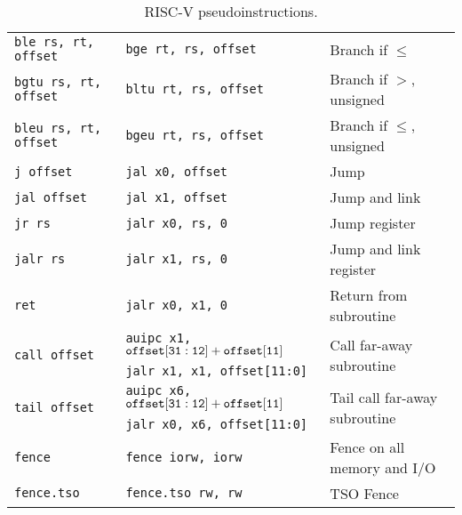 \begin{table}[h]
\begin{small}
\begin{center}
\begin{tabular}{l l l}
{\tt ble rs, rt, offset} & {\tt bge rt, rs, offset} & Branch if $\leq$ \\
{\tt bgtu rs, rt, offset} & {\tt bltu rt, rs, offset} & Branch if $>$, unsigned \\
{\tt bleu rs, rt, offset} & {\tt bgeu rt, rs, offset} & Branch if $\leq$, unsigned \\
\hline
{\tt j offset} & {\tt jal x0, offset} & Jump \\
{\tt jal offset} & {\tt jal x1, offset} & Jump and link \\
{\tt jr rs} & {\tt jalr x0, rs, 0} & Jump register \\
{\tt jalr rs} & {\tt jalr x1, rs, 0} & Jump and link register \\
{\tt ret} & {\tt jalr x0, x1, 0} & Return from subroutine \\
\multirow{2}{*}{\tt call offset} & {\tt auipc x1, ${\tt offset[31:12]} + {\tt offset[11]}$} & \multirow{2}{*}{Call far-away subroutine} \\
                                 & {\tt jalr x1, x1, offset[11:0]} \\
\multirow{2}{*}{\tt tail offset} & {\tt auipc x6, ${\tt offset[31:12]} + {\tt offset[11]}$} & \multirow{2}{*}{Tail call far-away subroutine} \\
                                 & {\tt jalr x0, x6, offset[11:0]} & \\
\hline
{\tt fence} & {\tt fence iorw, iorw} & Fence on all memory and I/O \\
{\tt fence.tso} & {\tt fence.tso rw, rw} & TSO Fence \\
\hline

\end{tabular}
\end{center}
\end{small}
\caption{RISC-V pseudoinstructions.}
\label{pseudos}
\end{table}

